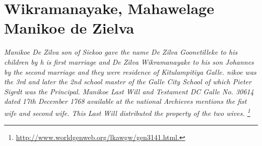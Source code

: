 \documentclass[10pt, openany]{book}
\begin{document}
\chapter{Wikramanayake, Mahawelage Manikoe de Zielva}
\label{00003772}
\textcolor{slmaroon}{\textit{Manikoe De Zilva son of Siekoo gave the name De Zilva Goonetilleke to his children by h is first marriage and De Zilva Wikramanayake to his son Johannes by the second marriage and they were residence of Kitulampitiya Galle.
nikoe was the 3rd and later the 2nd school master of the Galle City School of which Pieter Sigrdt was the Principal.
Manikoe Last Will and Testament DC Galle No. 30614 dated 17th December 1768 available at the national Archieves mentions the fist wife and second wife. This Last Will distributed the property of the two wives.
\footnote{\url{http://www.worldgenweb.org/lkawgw/gen3141.html.}}}}
\end{document}
